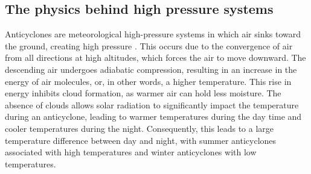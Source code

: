 \subsection{The physics behind high pressure systems}
Anticyclones are meteorological high-pressure systems in which air sinks toward the ground, creating high pressure \cite{spiridonovCyclonesAnticyclonesSpringerLink2020}. This occurs due to the convergence of air from all directions at high altitudes, which forces the air to move downward. The descending air undergoes adiabatic compression, resulting in an increase in the energy of air molecules, or, in other words, a higher temperature. This rise in energy inhibits cloud formation, as warmer air can hold less moisture. The absence of clouds allows solar radiation to significantly impact the temperature during an anticyclone, leading to warmer temperatures during the day time and cooler temperatures during the night. Consequently, this leads to a large temperature difference between day and night, with summer anticyclones associated with high temperatures and winter anticyclones with low temperatures. 

